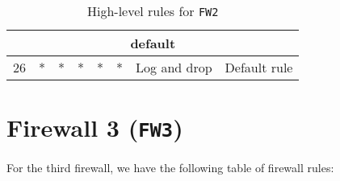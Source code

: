 \documentclass[a4paper, 11pt, oneside]{article}
\begin{document}
\begin{table}[H]
{\begin{tabular}{|llllllll|}
\multicolumn{8}{|c|}{{\color[HTML]{FE0000} default}}                                                                                                                                                                                                                                                                                                                                                                                                                                                                                   \\ \hline
\multicolumn{1}{|l|}{26}                        & \multicolumn{1}{l|}{*}                                                            & \multicolumn{1}{l|}{*}                                                              & \multicolumn{1}{l|}{*}                                                                 & \multicolumn{1}{l|}{*}                                                                   & \multicolumn{1}{l|}{*}                 & \multicolumn{1}{l|}{Log and drop}    & Default rule                           \\ \hline
\end{tabular}
}
\caption{High-level rules for \texttt{FW2}}
\end{table}

\section{Firewall 3 (\texttt{FW3})}
\paragraph{}For the third firewall, we have the following table of firewall rules:
\end{document}
